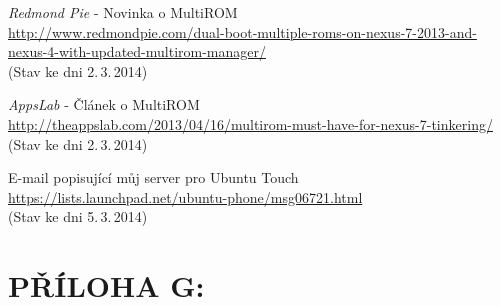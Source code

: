 \documentclass[12pt, a4paper, oneside]{article}
\newcommand{\It}{\textit}  %
\begin{document}
\begin{thebibliography}{99}
     \It{Redmond Pie} - Novinka o MultiROM\\
    \url{http://www.redmondpie.com/dual-boot-multiple-roms-on-nexus-7-2013-and-nexus-4-with-updated-multirom-manager/}\\
    (Stav ke dni 2.\,3.\,2014)

     \It{AppsLab} - Článek o MultiROM\\
    \url{http://theappslab.com/2013/04/16/multirom-must-have-for-nexus-7-tinkering/}\\
    (Stav ke dni 2.\,3.\,2014)

     E-mail popisující můj server pro Ubuntu Touch\\
    \url{https://lists.launchpad.net/ubuntu-phone/msg06721.html}\\
    (Stav ke dni 5.\,3.\,2014)

\end{thebibliography}

\newpage
\section*{PŘÍLOHA G:}
~
\listoffigures   %
\end{document}

